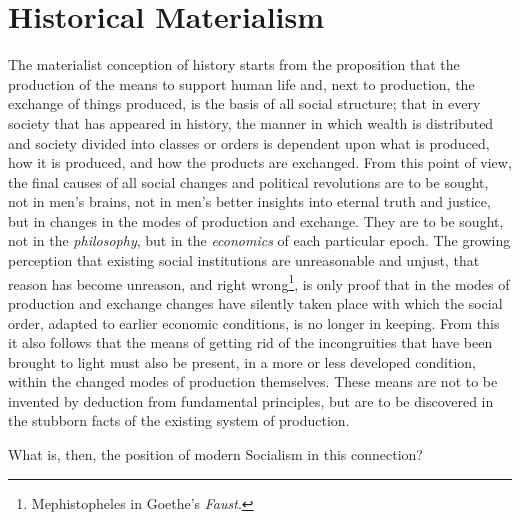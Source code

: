 \chapter{Historical Materialism}

The materialist conception of history starts from the proposition that the
production of the means to support human life and, next to production, the
exchange of things produced, is the basis of all social structure; that in every
society that has appeared in history, the manner in which wealth is distributed
and society divided into classes or orders is dependent upon what is produced,
how it is produced, and how the products are exchanged. From this point of
view, the final causes of all social changes and political revolutions are to
be sought, not in men's brains, not in men's better insights into eternal truth
and justice, but in changes in the modes of production and exchange. They are
to be sought, not in the \emph{philosophy}, but in the \emph{economics} of each
particular epoch. The growing perception that existing social institutions are
unreasonable and unjust, that reason has become unreason, and right
wrong\footnote{Mephistopheles in Goethe's \emph{Faust}.}, is only proof that in
the modes of production and exchange changes have silently taken place with
which the social order, adapted to earlier economic conditions, is no longer
in keeping. From this it also follows that the means of getting rid of the
incongruities that have been brought to light must also be present, in a more
or less developed condition, within the changed modes of production themselves.
These means are not to be invented by deduction from fundamental principles,
but are to be discovered in the stubborn facts of the existing system of
production.

What is, then, the position of modern Socialism in this connection?
